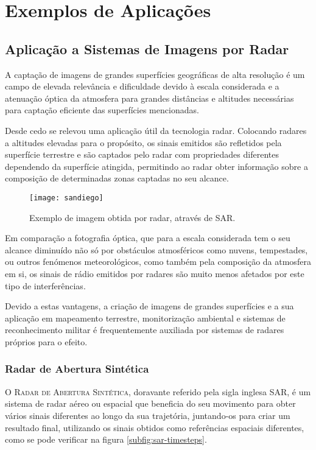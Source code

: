 \documentclass[purist,portuguese]{ist-report}
\begin{document}
\section{Exemplos de Aplicações}

\subsection{Aplicação a Sistemas de Imagens por Radar}

A captação de imagens de grandes superfícies geográficas de alta resolução é um campo de elevada relevância e dificuldade devido à escala considerada e a atenuação óptica da atmosfera para grandes distâncias e altitudes necessárias para captação eficiente das superfícies mencionadas.

Desde cedo se relevou uma aplicação útil da tecnologia radar. Colocando radares a altitudes elevadas para o propósito, os sinais emitidos são refletidos pela superfície terrestre e são captados pelo radar com propriedades diferentes dependendo da superfície atingida, permitindo ao radar obter informação sobre a composição de determinadas zonas captadas no seu alcance.

\begin{figure}[ht]
	\centering
	\texttt{[image: sandiego]}
	\caption{Exemplo de imagem obtida por radar, através de SAR.}
	\label{fig:sandiego}
\end{figure}

Em comparação a fotografia óptica, que para a escala considerada tem o seu alcance diminuído não só por obstáculos atmosféricos como nuvens, tempestades, ou outros fenómenos meteorológicos, como também pela composição da atmosfera em si, os sinais de rádio emitidos por radares são muito menos afetados por este tipo de interferências.

Devido a estas vantagens, a criação de imagens de grandes superfícies e a sua aplicação em mapeamento terrestre, monitorização ambiental e sistemas de reconhecimento militar é frequentemente auxiliada por sistemas de radares próprios para o efeito.

\subsubsection{Radar de Abertura Sintética}

O \textsc{Radar de Abertura Sintética}, doravante referido pela sigla inglesa SAR, é um sistema de radar aéreo ou espacial que beneficia do seu movimento para obter vários sinais diferentes ao longo da sua trajetória, juntando-os para criar um resultado final, utilizando os sinais obtidos como referências espaciais diferentes, como se pode verificar na figura \ref{subfig:sar-timesteps}.
\end{document}
